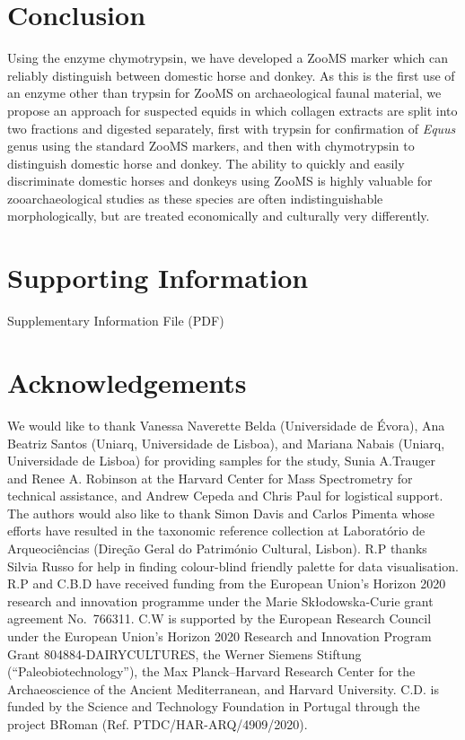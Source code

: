 \documentclass[preprint, 3p, authoryear]{elsarticle} %
\begin{document}
\hypertarget{conclusion}{%
\section{Conclusion}\label{conclusion}}

Using the enzyme chymotrypsin, we have developed a ZooMS marker which can reliably distinguish between domestic horse and donkey. As this is the first use of an enzyme other than trypsin for ZooMS on archaeological faunal material, we propose an approach for suspected equids in which collagen extracts are split into two fractions and digested separately, first with trypsin for confirmation of \emph{Equus} genus using the standard ZooMS markers, and then with chymotrypsin to distinguish domestic horse and donkey. The ability to quickly and easily discriminate domestic horses and donkeys using ZooMS is highly valuable for zooarchaeological studies as these species are often indistinguishable morphologically, but are treated economically and culturally very differently.

\hypertarget{supporting-information}{%
\section*{Supporting Information}\label{supporting-information}}

Supplementary Information File (PDF)

\hypertarget{acknowledgements}{%
\section*{Acknowledgements}\label{acknowledgements}}

We would like to thank Vanessa Naverette Belda (Universidade de Évora), Ana Beatriz Santos (Uniarq, Universidade de Lisboa), and Mariana Nabais (Uniarq, Universidade de Lisboa) for providing samples for the study, Sunia A.Trauger and Renee A. Robinson at the Harvard Center for Mass Spectrometry for technical assistance, and Andrew Cepeda and Chris Paul for logistical support. The authors would also like to thank Simon Davis and Carlos Pimenta whose efforts have resulted in the taxonomic reference collection at Laboratório de Arqueociências (Direção Geral do Património Cultural, Lisbon). R.P thanks Silvia Russo for help in finding colour-blind friendly palette for data visualisation. R.P and C.B.D have received funding from the European Union's Horizon 2020 research and innovation programme under the Marie Skłodowska-Curie grant agreement No.~766311. C.W is supported by the European Research Council under the European Union's Horizon 2020 Research and Innovation Program Grant 804884-DAIRYCULTURES, the Werner Siemens Stiftung (``Paleobiotechnology''), the Max Planck--Harvard Research Center for the Archaeoscience of the Ancient Mediterranean, and Harvard University. C.D. is funded by the Science and Technology Foundation in Portugal through the project BRoman (Ref. PTDC/HAR-ARQ/4909/2020).
\end{document}
